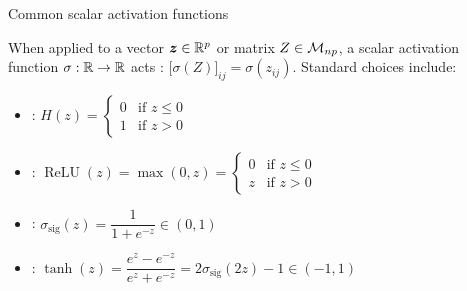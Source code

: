 \documentclass[aspectratio=169]{beamer}\usepackage[]{graphicx}\usepackage[]{xcolor}
\begin{document}
\begin{frame}{Common scalar activation functions}
\begin{definition}
When applied to a vector $\bm{z} \in \mathbb{R}^p$ or matrix $Z \in \mathcal{M}_{np}$, a scalar activation function $\sigma: \mathbb{R} \to \mathbb{R}$ acts : $\big[\sigma(Z)\big]_{ij} = \sigma(z_{ij})$. Standard choices include:
\begin{itemize}
\item {}: $H(z) = \begin{cases} 0 & \text{if } z \le 0 \\ 1 & \text{if } z > 0 \end{cases}$
\item {}: $\operatorname{ReLU}(z) = \max(0, z) = \begin{cases} 0 & \text{if } z \le 0 \\ z & \text{if } z > 0 \end{cases}$
\item {}: $\sigma_{\text{sig}}(z) = \dfrac{1}{1 + e^{-z}} \in (0, 1)$
\item {}: $\tanh(z) = \dfrac{e^z - e^{-z}}{e^z + e^{-z}} = 2\sigma_{\text{sig}}(2z) - 1 \in (-1, 1)$
\end{itemize}
\end{definition}
\end{frame}




\end{document}
